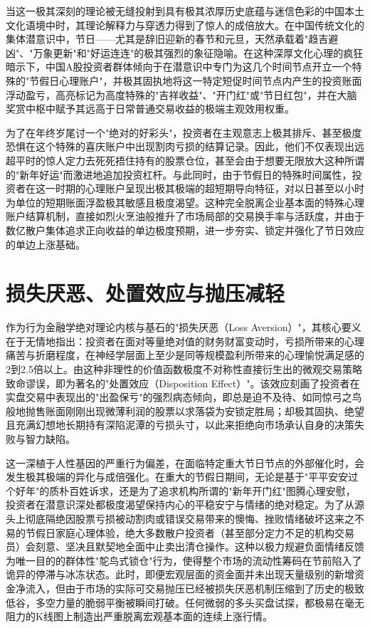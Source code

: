 \documentclass{cupb-thesis}
\begin{document}
{当这一极其深刻的理论被无缝投射到具有极其浓厚历史底蕴与迷信色彩的中国本土文化语境中时，其理论解释力与穿透力得到了惊人的成倍放大。在中国传统文化的集体潜意识中，节日——尤其是辞旧迎新的春节和元旦，天然承载着"趋吉避凶"、"万象更新"和"好运连连"的极其强烈的象征隐喻。在这种深厚文化心理的疯狂暗示下，中国A股投资者群体倾向于在潜意识中专门为这几个时间节点开立一个特殊的"节假日心理账户"，并极其固执地将这一特定短促时间节点内产生的投资账面浮动盈亏，高亮标记为高度特殊的"吉祥收益"、"开门红"或"节日红包"，并在大脑奖赏中枢中赋予其远高于日常普通交易收益的极端主观效用权重。


为了在年终岁尾讨一个"绝对的好彩头"，投资者在主观意志上极其排斥、甚至极度恐惧在这个特殊的喜庆账户中出现割肉亏损的结算记录。因此，他们不仅表现出远超平时的惊人定力去死死捂住持有的股票仓位，甚至会由于想要无限放大这种所谓的"新年好运"而激进地追加投资杠杆。与此同时，由于节假日的特殊时间属性，投资者在这一时期的心理账户呈现出极其极端的超短期导向特征，对以日甚至以小时为单位的短期账面浮盈极其敏感且极度渴望。这种完全脱离企业基本面的特殊心理账户结算机制，直接如烈火烹油般推升了市场局部的交易换手率与活跃度，并由于数亿散户集体追求正向收益的单边极度预期，进一步夯实、锁定并强化了节日效应的单边上涨基础。


\section{损失厌恶、处置效应与抛压减轻}


作为行为金融学绝对理论内核与基石的"损失厌恶（Loss Aversion）"，其核心要义在于无情地指出：投资者在面对等量绝对值的财务财富变动时，亏损所带来的心理痛苦与折磨程度，在神经学层面上至少是同等规模盈利所带来的心理愉悦满足感的2到2.5倍以上。由这种非理性的价值函数极度不对称性直接衍生出的微观交易策略致命谬误，即为著名的"处置效应（Disposition Effect）"。该效应刻画了投资者在实盘交易中表现出的"出盈保亏"的强烈病态倾向，即总是迫不及待、如同惊弓之鸟般地抛售账面刚刚出现微薄利润的股票以求落袋为安锁定胜局；却极其固执、绝望且充满幻想地长期持有深陷泥潭的亏损头寸，以此来拒绝向市场承认自身的决策失败与智力缺陷。


这一深植于人性基因的严重行为偏差，在面临特定重大节日节点的外部催化时，会发生极其极端的异化与成倍强化。在重大的节假日期间，无论是基于"平平安安过个好年"的质朴百姓诉求，还是为了追求机构所谓的"新年开门红"图腾心理安慰，投资者在潜意识深处都极度渴望保持内心的平稳安宁与情绪的绝对稳定。为了从源头上彻底隔绝因股票亏损被动割肉或错误交易带来的懊悔、挫败情绪破坏这来之不易的节假日家庭心理体验，绝大多数散户投资者（甚至部分定力不足的机构交易员）会刻意、坚决且默契地全面中止卖出清仓操作。这种以极力规避负面情绪反馈为唯一目的的群体性"鸵鸟式锁仓"行为，使得整个市场的流动性筹码在节前陷入了诡异的停滞与冰冻状态。此时，即便宏观层面的资金面并未出现天量级别的新增资金净流入，但由于市场的实际可交易抛压已经被损失厌恶机制压缩到了历史的极致低谷，多空力量的脆弱平衡被瞬间打破。任何微弱的多头买盘试探，都极易在毫无阻力的K线图上制造出严重脱离宏观基本面的连续上涨行情。


}
\end{document}
